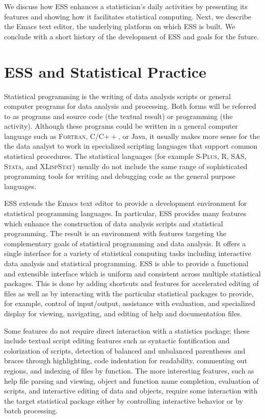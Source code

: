 \documentclass{article}
\newcommand*{\SAS}{\textsc{SAS}}
\newcommand*{\Splus}{\textsc{S-Plus}}
\newcommand*{\XLispStat}{\textsc{XLispStat}}
\newcommand*{\Stata}{\textsc{Stata}}
\newcommand*{\Fortran}{\textsc{Fortran}}
\begin{document}
We discuss how ESS enhances a statistician's daily activities by
presenting its features and showing how it facilitates statistical
computing.  Next, we describe the Emacs text editor, the underlying
platform on which ESS is built.  We conclude with a short history of
the development of ESS and goals for the future.

\section{ESS and Statistical Practice}
\label{sec:ess-extends-emacs}

Statistical programming is the writing of data analysis scripts or
general computer programs for data analysis and processing.  Both
forms will be referred to as programs and source code (the textual
result) or programming (the activity).  Although these programs could
be written in a general computer language such as \Fortran, C/C$++$,
or Java, it usually makes more sense for the the data analyst to work
in specialized scripting languages that support common statistical
procedures.  The statistical languages (for example \Splus, R, \SAS,
\Stata, and \XLispStat) usually do not include the same range of
sophisticated programming tools for writing and debugging code as the
general purpose languages.

ESS extends the Emacs text editor to provide a development environment
for statistical programming languages. In particular, ESS provides
many features which enhance the construction of data analysis scripts
and statistical programming.  The result is an environment with
features targeting the complementary goals of statistical programming
and data analysis.  It offers a single interface for a variety of
statistical computing tasks including interactive data analysis and
statistical programming.  ESS is able to provide a functional and
extensible interface which is uniform and consistent across multiple
statistical packages.  This is done by adding shortcuts and features
for accelerated editing of files as well as by interacting with the
particular statistical packages to provide, for example, control of
input/output, assistance with evaluation, and specialized display for
viewing, navigating, and editing of help and documentation files.

Some features do not require direct interaction with a statistics
package; these include textual script editing features such as
syntactic fontification and colorization of scripts, detection of
balanced and unbalanced parentheses and braces through highlighting,
code indentation for readability, commenting out regions, and indexing
of files by function.  The more interesting features, such as help
file parsing and viewing, object and function name completion,
evaluation of scripts, and interactive editing of data and objects,
require some interaction with the target statistical package either by
controlling interactive behavior or by batch processing.
\end{document}
